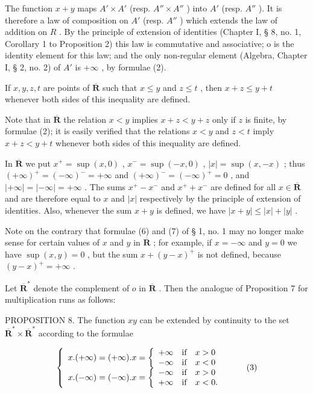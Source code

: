 The function \(x + y\) maps \(A' \times A'\) (resp. \(A'' \times A''\) ) into \(A'\) (resp. \(A''\) ). It is therefore a law of composition on \(A'\) (resp. \(A''\) ) which extends the law of addition on \(R\) . By the principle of extension of identities (Chapter I, § 8, no. 1, Corollary 1 to Proposition 2) this law is commutative and associative; o is the identity element for this law; and the only non-regular element (Algebra, Chapter I, § 2, no. 2) of \(A'\) is \(+\infty\) , by formulae (2).

If \(x, y, z, t\) are points of \(\overline{\mathbf{R}}\) such that \(x \leqslant y\) and \(z \leqslant t\) , then \(x + z \leqslant y + t\) whenever both sides of this inequality are defined.

Note that in \(\overline{\mathbf{R}}\) the relation \(x < y\) implies \(x + z < y + z\) only if \(z\) is finite, by formulae (2); it is easily verified that the relations \(x < y\) and \(z < t\) imply \(x + z < y + t\) whenever both sides of this inequality are defined.

In \(\overline{\mathbf{R}}\) we put \(x^{+} = \sup (x,0)\) , \(x^{-} = \sup (-x,0)\) , \(|x| = \sup (x, - x)\) ; thus \((+\infty)^{+} = (-\infty)^{-} = +\infty\) and \((+\infty)^{-} = (-\infty)^{+} = 0\) , and \(|+\infty| = |- \infty| = +\infty\) . The sums \(x^{+} - x^{-}\) and \(x^{+} + x^{-}\) are defined for all \(x \in \overline{\mathbf{R}}\) and are therefore equal to \(x\) and \(|x|\) respectively by the principle of extension of identities. Also, whenever the sum \(x + y\) is defined, we have \(|x + y| \leqslant |x| + |y|\) .

Note on the contrary that formulae (6) and (7) of § 1, no. 1 may no longer make sense for certain values of \(x\) and \(y\) in \(\overline{\mathbf{R}}\) ; for example, if \(x = -\infty\) and \(y = 0\) we have \(\sup (x, y) = 0\) , but the sum \(x + (y - x)^+\) is not defined, because \((y - x)^+ = +\infty\) .

Let \(\overline{\mathbf{R}}^{*}\) denote the complement of \(o\) in \(\overline{\mathbf{R}}\) . Then the analogue of Proposition 7 for multiplication runs as follows:

PROPOSITION 8. The function \(xy\) can be extended by continuity to the set \(\overline{\mathbf{R}}^* \times \overline{\mathbf{R}}^*\) according to the formulae

\[
\left\{ \begin{array}{l} x. (+ \infty) = (+ \infty). x = \left\{ \begin{array}{l l} + \infty & \text {if} \quad x > 0 \\ - \infty & \text {if} \quad x <   0 \end{array} \right. \\ x. (- \infty) = (- \infty). x = \left\{ \begin{array}{l l} - \infty & \text {if} \quad x > 0 \\ + \infty & \text {if} \quad x <   0. \end{array} \right. \end{array} \right.\tag{3}
\]

